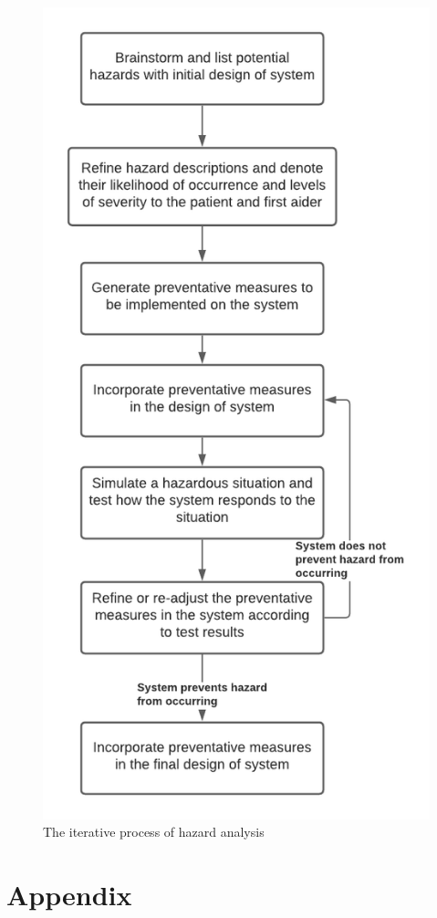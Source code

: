 \documentclass{article}
\begin{document}
\begin{figure}[!htb]
    	\centering
    	\includegraphics[width=0.60\linewidth]{hazard analysis - roadmap.png}
    	\caption{The iterative process of hazard analysis}
    	\label{flowchart}
    \end{figure}
    
\newpage
\section{Appendix}
	\printbibliography
\end{document}
